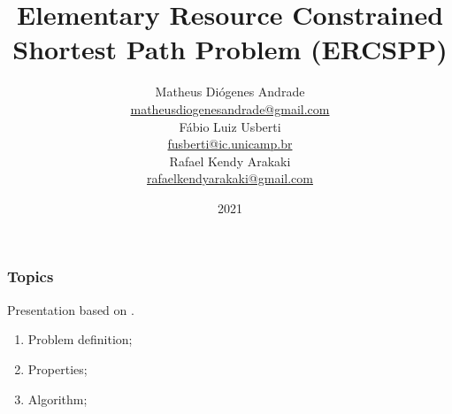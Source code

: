 \documentclass[notheorems]{beamer}
\title{Elementary Resource Constrained Shortest Path Problem (ERCSPP)}
\author{Matheus Diógenes Andrade\\
\href{mailto:matheusdiogenesandrade@gmail.com}{matheusdiogenesandrade@gmail.com}\\
Fábio Luiz Usberti\\
\href{mailto:fusberti@ic.unicamp.br}{fusberti@ic.unicamp.br}\\
Rafael Kendy Arakaki\\
\href{mailto:rafaelkendyarakaki@gmail.com}{rafaelkendyarakaki@gmail.com}
}
\institute{Institute of Computing - University of Campinas}
\date{2021}
\theoremstyle{definition}
\theoremstyle{example}
\theoremstyle{plain}
\begin{document}
\frame{\titlepage}

\begin{frame}
  \frametitle{Topics}
  Presentation based on .
  \begin{enumerate}
    \item Problem definition;
    \item Properties;
    \item Algorithm;
  \end{enumerate}
\end{frame}







\begin{frame}
\printbibliography
\end{frame}
\end{document}
